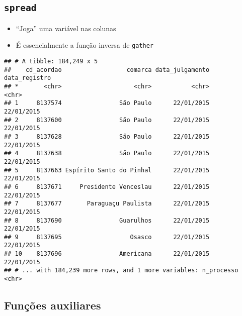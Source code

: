 \documentclass[]{book}
\newenvironment{Shaded}{\begin{snugshade}}{\end{snugshade}}
\newcommand{\KeywordTok}[1]{\textcolor[rgb]{0.13,0.29,0.53}{\textbf{{#1}}}}
\newcommand{\DataTypeTok}[1]{\textcolor[rgb]{0.13,0.29,0.53}{{#1}}}
\newcommand{\StringTok}[1]{\textcolor[rgb]{0.31,0.60,0.02}{{#1}}}
\newcommand{\OtherTok}[1]{\textcolor[rgb]{0.56,0.35,0.01}{{#1}}}
\newcommand{\NormalTok}[1]{{#1}}
\providecommand{\tightlist}{%
  \setlength{\itemsep}{0pt}\setlength{\parskip}{0pt}}
\begin{document}
\subsection{\texorpdfstring{\texttt{spread}}{spread}}\label{spread}

\begin{itemize}
\tightlist
\item
  ``Joga'' uma variável nas colunas
\item
  É essencialmente a função inversa de \texttt{gather}
\end{itemize}

\begin{Shaded}
\end{Shaded}

\begin{verbatim}
## # A tibble: 184,249 x 5
##    cd_acordao                  comarca data_julgamento data_registro
## *       <chr>                    <chr>           <chr>         <chr>
## 1     8137574                São Paulo      22/01/2015    22/01/2015
## 2     8137600                São Paulo      22/01/2015    22/01/2015
## 3     8137628                São Paulo      22/01/2015    22/01/2015
## 4     8137638                São Paulo      22/01/2015    22/01/2015
## 5     8137663 Espírito Santo do Pinhal      22/01/2015    22/01/2015
## 6     8137671     Presidente Venceslau      22/01/2015    22/01/2015
## 7     8137677       Paraguaçu Paulista      22/01/2015    22/01/2015
## 8     8137690                Guarulhos      22/01/2015    22/01/2015
## 9     8137695                   Osasco      22/01/2015    22/01/2015
## 10    8137696                Americana      22/01/2015    22/01/2015
## # ... with 184,239 more rows, and 1 more variables: n_processo <chr>
\end{verbatim}

\subsection{Funções auxiliares}\label{funcoes-auxiliares}
\end{document}
